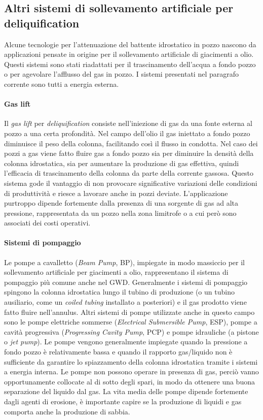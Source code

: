 \subsection{Altri sistemi di sollevamento artificiale per deliquification} 
Alcune tecnologie per l'attenuazione del battente idrostatico in pozzo nascono da applicazioni pensate in origine per il sollevamento artificiale di giacimenti a olio. Questi sistemi sono stati riadattati per il trascinamento dell'acqua a fondo pozzo o per agevolare l'afflusso del gas in pozzo. I sistemi presentati nel paragrafo corrente sono tutti a energia esterna.
\paragraph{Gas lift}
Il \textit{gas lift} per \textit{deliquification} consiste nell'iniezione di gas da una fonte esterna al pozzo a una certa profondità. Nel campo dell'olio il gas iniettato a fondo pozzo diminuisce il peso della colonna, facilitando così il flusso in condotta. Nel caso dei pozzi a gas viene fatto fluire gas a fondo pozzo sia per diminuire la densità della colonna idrostatica, sia per aumentare la produzione di gas effettiva, quindi l'efficacia di trascinamento della colonna da parte della corrente gassosa. Questo sistema gode il vantaggio di non provocare significative variazioni delle condizioni di produttività e riesce a lavorare anche in pozzi deviate. L'applicazione purtroppo dipende fortemente dalla presenza di una sorgente di gas ad alta pressione, rappresentata da un pozzo nella zona limitrofe o a cui però sono associati dei costi operativi.
\paragraph{Sistemi di pompaggio}
Le pompe a cavalletto (\textit{Beam Pump}, BP), impiegate in modo massiccio per il sollevamento artificiale per giacimenti a olio, rappresentano il sistema di pompaggio più comune anche nel GWD. Generalmente i sistemi di pompaggio spingono la colonna idrostatica lungo il tubino di produzione (o un tubino ausiliario, come un \textit{coiled tubing} installato a posteriori) e il gas prodotto viene fatto fluire nell'annulus. Altri sistemi di pompe utilizzate anche in questo campo sono le pompe elettriche sommerse (\textit{Electrical Submersible Pump},   ESP), pompe a cavità progressiva (\textit{Progressing Cavity Pump}, PCP) e pompe idrauliche (a pistone o \textit{jet pump}). Le pompe vengono generalmente impiegate quando la pressione a fondo pozzo è relativamente bassa e quando il rapporto gas/liquido non è sufficiente da garantire lo spiazzamento della colonna idrostatica tramite i sistemi a energia interna. Le pompe non possono operare in presenza di gas, perciò vanno opportunamente collocate al di sotto degli spari, in modo da ottenere una buona separazione del liquido dal gas. La vita media delle pompe dipende fortemente dagli agenti di erosione, è importante capire se la produzione di liquidi e gas comporta anche la produzione di sabbia.

